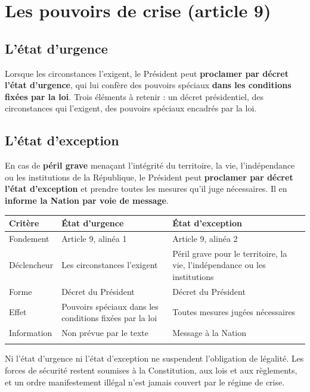 \documentclass[11pt,a4paper,oneside]{report}
\begin{document}
\section{Les pouvoirs de crise (article 9)}
\subsection{L'état d'urgence}
Lorsque les circonstances l'exigent, le Président peut \textbf{proclamer par décret l'état d'urgence}, qui lui confère des pouvoirs spéciaux \textbf{dans les conditions fixées par la loi}. Trois éléments à retenir : un décret présidentiel, des circonstances qui l'exigent, des pouvoirs spéciaux encadrés par la loi.

\subsection{L'état d'exception}
En cas de \textbf{péril grave} menaçant l'intégrité du territoire, la vie, l'indépendance ou les institutions de la République, le Président peut \textbf{proclamer par décret l'état d'exception} et prendre toutes les mesures qu'il juge nécessaires. Il en \textbf{informe la Nation par voie de message}.

\begin{longtable}{>{\raggedright\arraybackslash}p{} >{\raggedright\arraybackslash}p{} >{\raggedright\arraybackslash}p{}}
\toprule
\textbf{\color{navy}Critère} & \textbf{\color{navy}État d'urgence} & \textbf{\color{navy}État d'exception} \\
\midrule\endhead
Fondement & Article 9, alinéa 1 & Article 9, alinéa 2 \\
\addlinespace[1pt]
Déclencheur & Les circonstances l'exigent & Péril grave pour le territoire, la vie, l'indépendance ou les institutions \\
\addlinespace[1pt]
Forme & Décret du Président & Décret du Président \\
\addlinespace[1pt]
Effet & Pouvoirs spéciaux dans les conditions fixées par la loi & Toutes mesures jugées nécessaires \\
\addlinespace[1pt]
Information & Non prévue par le texte & Message à la Nation \\
\addlinespace[1pt]
\bottomrule
\end{longtable}
\begin{warnbox}[title={Point de vigilance — Portée pour un policier}]
Ni l'état d'urgence ni l'état d'exception ne suspendent l'obligation de légalité. Les forces de sécurité restent soumises à la Constitution, aux lois et aux règlements, et un ordre manifestement illégal n'est jamais couvert par le régime de crise.
\end{warnbox}
\end{document}
